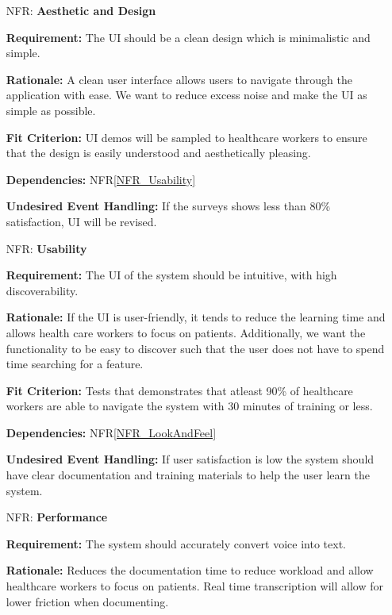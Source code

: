 \documentclass[12pt]{article}
\newcounter{nfrnum} %
\begin{document}
\noindent \begin{itemize}

\item[NFR\refstepcounter{nfrnum}\thenfrnum \label{NFR_LookAndFeel}:] \textbf{Aesthetic and Design}

    \textbf{Requirement:} The UI should be a clean design which is minimalistic and simple.

    \textbf{Rationale:} A clean user interface allows users to navigate through the application with ease. We want to reduce excess noise and make the UI as simple as possible.

    \textbf{Fit Criterion:} UI demos will be sampled to healthcare workers to ensure that the design is easily understood and aesthetically pleasing.

    \textbf{Dependencies:} NFR\ref{NFR_Usability}

    \textbf{Undesired Event Handling:} If the surveys shows less than 80\% satisfaction, UI will be revised.


\item[NFR\refstepcounter{nfrnum}\thenfrnum \label{NFR_Usability}:] \textbf{Usability}

    \textbf{Requirement:} The UI of the system should be intuitive, with high discoverability.

    \textbf{Rationale:} If the UI is user-friendly, it tends to reduce the learning time and allows health care workers to focus on patients. Additionally, we want the functionality to be easy to discover such that the user does not have to spend time searching for a feature.
  

    \textbf{Fit Criterion:} Tests that demonstrates that atleast 90\% of healthcare workers are able to navigate the system with 30 minutes of training or less.

    \textbf{Dependencies:} NFR\ref{NFR_LookAndFeel}

    \textbf{Undesired Event Handling:} If user satisfaction is low the system should have clear documentation and training materials to help the user learn the system.

\item[NFR\refstepcounter{nfrnum}\thenfrnum \label{NFR_Performance}:] \textbf{Performance}

    \textbf{Requirement:} The system should accurately convert voice into text.

    \textbf{Rationale:} Reduces the documentation time to reduce workload and allow healthcare workers to focus on patients. Real time transcription will allow for lower friction when documenting.
    

\end{itemize}
\end{document}
